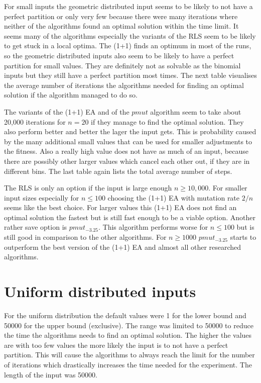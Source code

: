 

For small inputs the geometric distributed input seems to be likely to not have a perfect partition or only very few because there were many iterations where neither of the algorithms found an optimal solution within the time limit.
It seems many of the algorithms especially the variants of the RLS seem to be likely to get stuck in a local optima.
The (1+1) finds an optimum in most of the runs, so the geometric distributed inputs also seem to be likely to have a perfect partition for small values.
They are definitely not as solvable as the binomial inputs but they still have a perfect partition most times.
The next table visualises the average number of iterations the algorithms needed for finding an optimal solution if the algorithm managed to do so.



The variants of the (1+1) EA and of the $pmut$ algorithm seem to take about 20,000 iterations for $n=20$ if they manage to find the optimal solution.
They also perform better and better the lager the input gets.
This is probability caused by the many additional small values that can be used for smaller adjustments to the fitness.
Also a really high value does not have as much of an input, because there are possibly other larger values which cancel each other out, if they are in different bins.
The last table again lists the total average number of steps.



The RLS is only an option if the input is large enough $n \ge 10,000$. For smaller input sizes especially for $n \le 100$ choosing the (1+1) EA with mutation rate $2/n$ seems like the best choice. For larger values this (1+1) EA does not find an optimal solution the fastest but is still fast enough to be a viable option. Another rather save option is $pmut_{-3.25}$. This algorithm performs worse for $n \le 100$ but is still good in comparison to the other algorithms. For $n \ge 1000$ $pmut_{-3.25}$ starts to outperform the best version of the (1+1) EA and almost all other researched algorithms.
\section{Uniform distributed inputs}
For the uniform distribution the default values were 1 for the lower bound and 50000 for the upper bound (exclusive).
The range was limited to 50000 to reduce the time the algorithms needs to find an optimal solution.
The higher the values are with too few values the more likely the input is to not have a perfect partition\cite{borgs2001phase}.
This will cause the algorithms to always reach the limit for the number of iterations which drastically increases the time needed for the experiment.
The length of the input was 50000.


